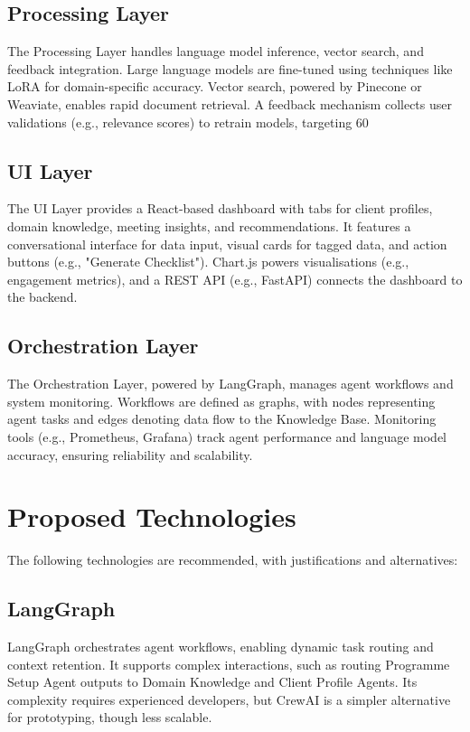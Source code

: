 \documentclass{article}
\begin{document}
\subsection{Processing Layer}
The Processing Layer handles language model inference, vector search, and feedback integration. Large language models are fine-tuned using techniques like LoRA for domain-specific accuracy. Vector search, powered by Pinecone or Weaviate, enables rapid document retrieval. A feedback mechanism collects user validations (e.g., relevance scores) to retrain models, targeting 60%

\subsection{UI Layer}
The UI Layer provides a React-based dashboard with tabs for client profiles, domain knowledge, meeting insights, and recommendations. It features a conversational interface for data input, visual cards for tagged data, and action buttons (e.g., "Generate Checklist"). Chart.js powers visualisations (e.g., engagement metrics), and a REST API (e.g., FastAPI) connects the dashboard to the backend.

\subsection{Orchestration Layer}
The Orchestration Layer, powered by LangGraph, manages agent workflows and system monitoring. Workflows are defined as graphs, with nodes representing agent tasks and edges denoting data flow to the Knowledge Base. Monitoring tools (e.g., Prometheus, Grafana) track agent performance and language model accuracy, ensuring reliability and scalability.

\section{Proposed Technologies}
The following technologies are recommended, with justifications and alternatives:

\subsection{LangGraph}
LangGraph orchestrates agent workflows, enabling dynamic task routing and context retention. It supports complex interactions, such as routing Programme Setup Agent outputs to Domain Knowledge and Client Profile Agents. Its complexity requires experienced developers, but CrewAI is a simpler alternative for prototyping, though less scalable.
\end{document}

